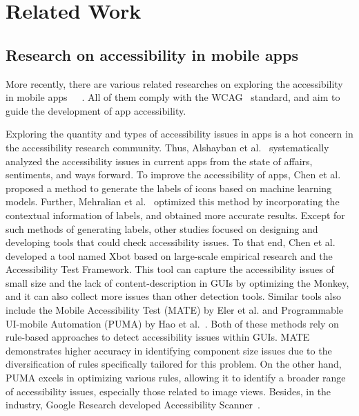\section{Related Work}
\label{sec: related work}

\subsection{Research on accessibility in mobile apps}\label{sub: research1}
More recently, there are various related researches on exploring the accessibility in mobile apps~\cite{Alshayban2020AccessibilityII}~\cite{Chen2020UnblindYA}~\cite{Tomlinson2016TalkinAT}.
All of them comply with the WCAG~\cite{WCAG} standard, and aim to guide the development of app accessibility.

Exploring the quantity and types of accessibility issues in apps is a hot concern in the accessibility research community.
Thus, Alshayban et al.~\cite{Alshayban2020AccessibilityII} systematically analyzed the accessibility issues in current apps from the state of affairs, sentiments, and ways forward.
To improve the accessibility of apps, Chen et al.~\cite{Chen2020UnblindYA} proposed a method to generate the labels of icons based on machine learning models.
Further, Mehralian et al.~\cite{Mehralian2021DatadrivenAR} optimized this method by incorporating the contextual information of labels, and obtained more accurate results. 
Except for such methods of generating labels, other studies focused on designing and developing tools that could check accessibility issues. 
To that end, Chen et al.~\cite{Chen2021AccessibleON} developed a tool named Xbot based on large-scale empirical research and the Accessibility Test Framework. 
This tool can capture the accessibility issues of small size and the lack of content-description in GUIs by optimizing the Monkey, and it can also collect more issues than other detection tools. 
Similar tools also include the Mobile Accessibility Test (MATE) by Eler et al.\cite{Eler2018AutomatedAT} and Programmable UI-mobile Automation (PUMA) by Hao et al.~\cite{Hao2014PUMAPU}. 
Both of these methods rely on rule-based approaches to detect accessibility issues within GUIs. 
MATE demonstrates higher accuracy in identifying component size issues due to the diversification of rules specifically tailored for this problem. 
On the other hand, PUMA excels in optimizing various rules, allowing it to identify a broader range of accessibility issues, especially those related to image views. 
Besides, in the industry, Google Research developed Accessibility Scanner~\cite{AccessibilityScanner}.
